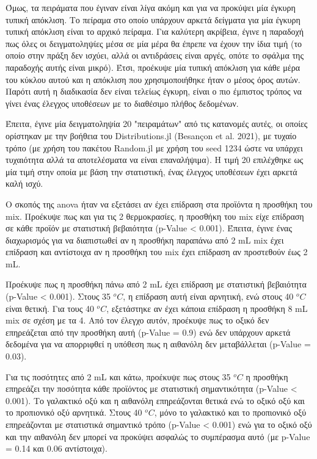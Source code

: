 \documentclass[11pt]{report}
\makeatletter
\newcommand{\citeprocitem}[2]{\hyper@linkstart{cite}{citeproc_bib_item_#1}#2\hyper@linkend}
\makeatother
\begin{document}
Όμως, τα πειράματα που έγιναν είναι λίγα ακόμη και για να προκύψει μία έγκυρη τυπική απόκλιση. Το πείραμα στο οποίο υπάρχουν αρκετά δείγματα για μία έγκυρη τυπική απόκλιση είναι το αρχικό πείραμα. Για καλύτερη ακρίβεια, έγινε η παραδοχή πως όλες οι δειγματοληψίες μέσα σε μία μέρα θα έπρεπε να έχουν την ίδια τιμή (το οποίο στην πράξη δεν ισχύει, αλλά οι αντιδράσεις είναι αργές, οπότε το σφάλμα της παραδοχής αυτής είναι μικρό). Έτσι, προέκυψε μία τυπική απόκλιση για κάθε μέρα του κύκλου αυτού και η απόκλιση που χρησιμοποιήθηκε ήταν ο μέσος όρος αυτών. Παρότι αυτή η διαδικασία δεν είναι τελείως έγκυρη, είναι ο πιο έμπιστος τρόπος να γίνει ένας έλεγχος υποθέσεων με το διαθέσιμο πλήθος δεδομένων.

Έπειτα, έγινε μία δειγματοληψία 20 "πειραμάτων" από τις κατανομές αυτές, οι οποίες ορίστηκαν με την βοήθεια του Distributions.jl (\citeprocitem{5}{Besançon et al. 2021}), με τυχαίο τρόπο (με χρήση του πακέτου Random.jl με χρήση του seed 1234 ώστε να υπάρχει τυχαιότητα αλλά τα αποτελέσματα να είναι επαναλήψιμα). Η τιμή 20 επιλέχθηκε ως μία τιμή στην οποία με βάση την στατιστική, ένας έλεγχος υποθέσεων έχει αρκετά καλή ισχύ.

Ο σκοπός της \acrshort{anova} ήταν να εξετάσει αν έχει επίδραση στα προϊόντα η προσθήκη του \acrshort{mix}. Προέκυψε πως και για τις 2 θερμοκρασίες, η προσθήκη του \acrshort{mix} είχε επίδραση σε κάθε προϊόν με στατιστική βεβαιότητα (p-Value < 0.001). Έπειτα, έγινε ένας διαχωρισμός για να διαπιστωθεί αν η προσθήκη παραπάνω από 2 mL \acrshort{mix} έχει επίδραση και αντίστοιχα αν η προσθήκη του \acrshort{mix} έχει επίδραση αν προστεθούν έως 2 mL.

Προέκυψε πως η προσθήκη πάνω από 2 mL έχει επίδραση με στατιστική βεβαιότητα (p-Value < 0.001). Στους 35 \(^oC\), η επίδραση αυτή είναι αρνητική, ενώ στους 40 \(^oC\) είναι θετική. Για τους 40 \(^oC\), εξετάστηκε αν έχει κάποια επίδραση η προσθήκη 8 mL \acrshort{mix} σε σχέση με τα 4. Από τον έλεγχο αυτόν, προέκυψε πως το οξικό δεν επηρεάζεται από την προσθήκη αυτή (p-Value = 0.9) ενώ δεν υπάρχουν αρκετά δεδομένα για να απορριφθεί η υπόθεση πως η αιθανόλη δεν μεταβάλλεται (p-Value = 0.03). 

Για τις ποσότητες από 2 mL και κάτω, προέκυψε πως στους 35 \(^oC\) η προσθήκη επηρεάζει την ποσότητα κάθε προϊόντος με στατιστική σημαντικότητα (p-Value < 0.001). Το γαλακτικό οξύ και η αιθανόλη επηρεάζονται θετικά ενώ το οξικό οξύ και το προπιονικό οξύ αρνητικά. Στους 40 \(^oC\), μόνο το γαλακτικό και το προπιονικό οξύ επηρεάζονται με στατιστικά σημαντικό τρόπο (p-Value < 0.001) ενώ για το οξικό οξύ και την αιθανόλη δεν μπορεί να προκύψει ασφαλώς το συμπέρασμα αυτό (με p-Value = 0.14 και 0.06 αντίστοιχα).
\end{document}
